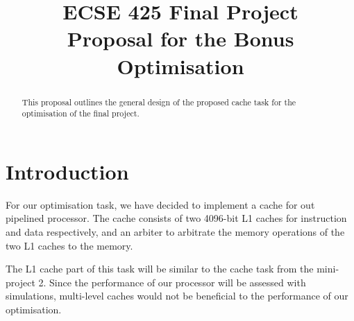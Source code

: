 \documentclass[lettersize,conference]{IEEEtran}
\begin{document}
\title{ECSE 425 Final Project\\Proposal for the Bonus Optimisation}

\author{
\and
{}
\and
{}
\and
{}
\and
{}
}

\maketitle

\begin{abstract}
This proposal outlines the general design of the proposed cache task for the optimisation of the final project.
\end{abstract}

\section{Introduction}
For our optimisation task, we have decided to implement a cache for out pipelined processor. The cache consists of two 4096-bit L1 caches for instruction and data respectively, and an arbiter to arbitrate the memory operations of the two L1 caches to the memory.\par
The L1 cache part of this task will be similar to the cache task from the mini-project 2. Since the performance of our processor will be assessed with simulations, multi-level caches would not be beneficial to the performance of our optimisation.
\end{document}

